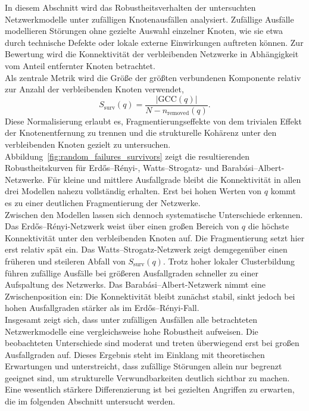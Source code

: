 \documentclass[12pt,a4paper]{article}
\begin{document}
In diesem Abschnitt wird das Robustheitsverhalten der untersuchten
Netzwerkmodelle unter zufälligen Knotenausfällen analysiert. Zufällige Ausfälle
modellieren Störungen ohne gezielte Auswahl einzelner Knoten, wie sie etwa durch
technische Defekte oder lokale externe Einwirkungen auftreten können. Zur
Bewertung wird die Konnektivität der verbleibenden Netzwerke in Abhängigkeit vom
Anteil entfernter Knoten betrachtet.\\
Als zentrale Metrik wird die Größe der größten verbundenen Komponente relativ zur
Anzahl der verbleibenden Knoten verwendet,
\[
S_{\text{surv}}(q) = \frac{|\mathrm{GCC}(q)|}{N - n_{\text{removed}}(q)}.
\]
Diese Normalisierung erlaubt es, Fragmentierungseffekte von dem trivialen Effekt
der Knotenentfernung zu trennen und die strukturelle Kohärenz unter den
verbleibenden Knoten gezielt zu untersuchen.\\
Abbildung~\ref{fig:random_failures_survivors} zeigt die resultierenden
Robustheitskurven für Erdős--Rényi-, Watts--Strogatz- und
Barabási--Albert-Netzwerke. Für kleine und mittlere Ausfallgrade bleibt die
Konnektivität in allen drei Modellen nahezu vollständig erhalten. Erst bei hohen
Werten von $q$ kommt es zu einer deutlichen Fragmentierung der Netzwerke.\\
Zwischen den Modellen lassen sich dennoch systematische Unterschiede erkennen.
Das Erdős--Rényi-Netzwerk weist über einen großen Bereich von $q$ die höchste
Konnektivität unter den verbleibenden Knoten auf. Die Fragmentierung setzt hier
erst relativ spät ein. Das Watts--Strogatz-Netzwerk zeigt demgegenüber einen
früheren und steileren Abfall von $S_{\text{surv}}(q)$. Trotz hoher lokaler
Clusterbildung führen zufällige Ausfälle bei größeren Ausfallgraden schneller
zu einer Aufspaltung des Netzwerks. Das Barabási--Albert-Netzwerk nimmt eine
Zwischenposition ein: Die Konnektivität bleibt zunächst stabil, sinkt jedoch bei
hohen Ausfallgraden stärker als im Erdős--Rényi-Fall.\\
Insgesamt zeigt sich, dass unter zufälligen Ausfällen alle betrachteten
Netzwerkmodelle eine vergleichsweise hohe Robustheit aufweisen. Die beobachteten
Unterschiede sind moderat und treten überwiegend erst bei großen Ausfallgraden
auf. Dieses Ergebnis steht im Einklang mit theoretischen Erwartungen und
unterstreicht, dass zufällige Störungen allein nur begrenzt geeignet sind, um
strukturelle Verwundbarkeiten deutlich sichtbar zu machen. Eine wesentlich
stärkere Differenzierung ist bei gezielten Angriffen zu erwarten, die im
folgenden Abschnitt untersucht werden.
\end{document}
